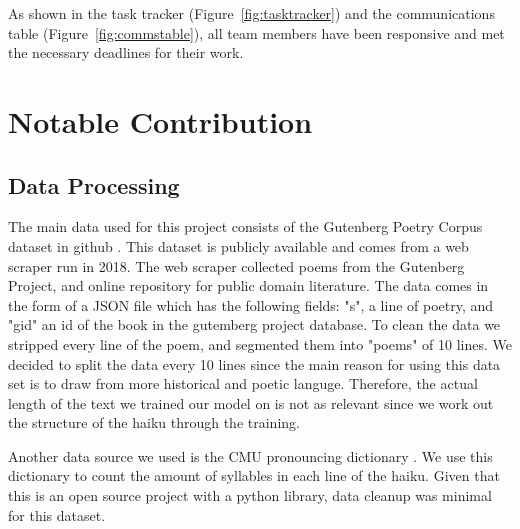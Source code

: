 \documentclass{article} %
\begin{document}
As shown in the task tracker (Figure~\ref{fig:tasktracker}) and the communications table (Figure~\ref{fig:commstable}), all team members have been responsive and met the necessary deadlines for their work.



\section{Notable Contribution}

\subsection{Data Processing}
The main data used for this project consists of the Gutenberg Poetry Corpus dataset in
github \citep{gutenberg_dataset}.
This dataset is publicly available and comes from a web scraper run in 2018.
The web scraper collected poems from the Gutenberg Project, and online repository for public domain literature.
The data comes in the form of a JSON file which has the following fields:
"s", a line of poetry, and "gid" an id of the book in the gutemberg project database.
To clean the data we stripped every line of the poem, and segmented them into "poems" of 10 lines.
We decided to split the data every 10 lines since the main reason for using this data set is to draw from more historical and poetic languge.
Therefore, the actual length of the text we trained our model on is not as relevant since we work out the structure of the haiku through the training.

Another data source we used is the CMU pronouncing dictionary \citep{cmu_pronouncing_dictionary}.
We use this dictionary to count the amount of syllables in each line of the haiku.
Given that this is an open source project with a python library, data cleanup was minimal for this dataset.
\end{document}
